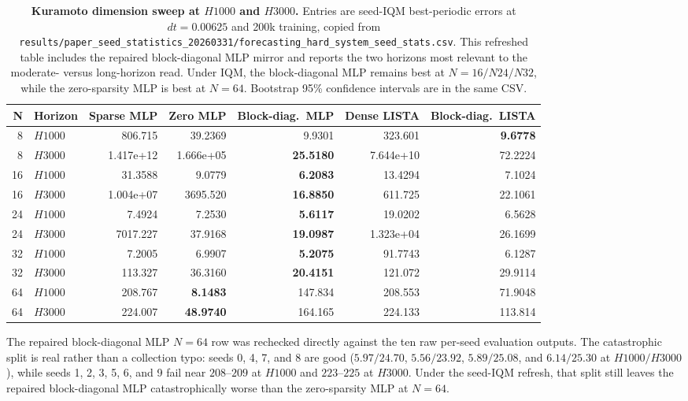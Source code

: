 \begin{table}[ht]
\centering
\scriptsize
\setlength{\tabcolsep}{4pt}
\begin{tabular}{rlrrrrr}
\toprule
N & Horizon & Sparse MLP & Zero MLP & Block-diag.\ MLP & Dense LISTA & Block-diag.\ LISTA \\
\midrule
8 & $H1000$ & 806.715 & 39.2369 & 9.9301 & 323.601 & \textbf{9.6778} \\
8 & $H3000$ & 1.417e+12 & 1.666e+05 & \textbf{25.5180} & 7.644e+10 & 72.2224 \\
16 & $H1000$ & 31.3588 & 9.0779 & \textbf{6.2083} & 13.4294 & 7.1024 \\
16 & $H3000$ & 1.004e+07 & 3695.520 & \textbf{16.8850} & 611.725 & 22.1061 \\
24 & $H1000$ & 7.4924 & 7.2530 & \textbf{5.6117} & 19.0202 & 6.5628 \\
24 & $H3000$ & 7017.227 & 37.9168 & \textbf{19.0987} & 1.323e+04 & 26.1699 \\
32 & $H1000$ & 7.2005 & 6.9907 & \textbf{5.2075} & 91.7743 & 6.1287 \\
32 & $H3000$ & 113.327 & 36.3160 & \textbf{20.4151} & 121.072 & 29.9114 \\
64 & $H1000$ & 208.767 & \textbf{8.1483} & 147.834 & 208.553 & 71.9048 \\
64 & $H3000$ & 224.007 & \textbf{48.9740} & 164.165 & 224.133 & 113.814 \\
\bottomrule
\end{tabular}
\caption{\textbf{Kuramoto dimension sweep at $H1000$ and $H3000$.} Entries are seed-IQM best-periodic errors at $dt=0.00625$ and 200k training, copied from \texttt{results/paper\_seed\_statistics\_20260331/forecasting\_hard\_system\_seed\_stats.csv}. This refreshed table includes the repaired block-diagonal MLP mirror and reports the two horizons most relevant to the moderate- versus long-horizon read. Under IQM, the block-diagonal MLP remains best at $N=16/N24/N32$, while the zero-sparsity MLP is best at $N=64$. Bootstrap 95\% confidence intervals are in the same CSV.}
\label{tab:review-hard-kuramoto-dims-20260314}
\end{table}

The repaired block-diagonal MLP $N=64$ row was rechecked directly against the
ten raw per-seed evaluation outputs. The catastrophic split
is real rather than a collection typo: seeds 0, 4, 7, and 8 are good
($5.97/24.70$, $5.56/23.92$, $5.89/25.08$, and $6.14/25.30$ at
$H1000/H3000$), while seeds 1, 2, 3, 5, 6, and 9 fail near $208$--$209$ at
$H1000$ and $223$--$225$ at $H3000$. Under the seed-IQM refresh, that split
still leaves the repaired block-diagonal MLP catastrophically worse than the
zero-sparsity MLP at $N=64$.

